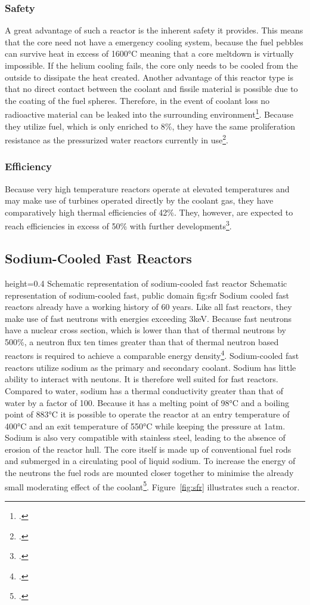 \subsubsection{Safety}
A great advantage of such a reactor is the inherent safety it provides. This means that the core
need not have a emergency cooling system, because the fuel pebbles can survive heat in excess of 1600°C
meaning that a core meltdown is virtually impossible. If the helium cooling fails, the core only needs to
be cooled from the outside to dissipate the heat created. Another advantage of this reactor type is that
no direct contact between the coolant and fissile material is possible due to the coating of the fuel
spheres. Therefore, in the event of coolant loss no radioactive material can be leaked
into the surrounding environment\footcite[18-21]{VHTRTS}.
Because they utilize fuel, which is only enriched to 8\%, they have the same proliferation resistance
as the pressurized water reactors currently in use\footcite{VHTRTS}.
\subsubsection{Efficiency}
Because very high temperature reactors operate at elevated temperatures and may make use of turbines
operated directly by the coolant gas, they have comparatively high thermal efficiencies of 42\%.
They, however, are expected to reach efficiencies in excess of 50\% with further developments\footcite[62]{T4Gen}.
\pagebreak
\subsection{Sodium-Cooled Fast Reactors}\label{chap:sfr}
    {height=0.4\textheight}
    {Schematic representation of sodium-cooled fast reactor}
    {Schematic representation of sodium-cooled fast, public domain}
    {fig:sfr}
Sodium cooled fast reactors already have a working history of 60 years. Like all fast reactors, they make
use of fast neutrons with energies exceeding 3keV. Because fast neutrons have a nuclear cross section, which is lower than that
of thermal neutrons by 500\%, a neutron flux ten times greater than that of thermal neutron based reactors
is required to achieve a comparable energy density\footcite[120-122]{ReactorPhysics}.
Sodium-cooled fast reactors utilize sodium as the primary and secondary coolant. Sodium has little
ability to interact with neutons. It is therefore well suited for fast reactors. Compared
to water, sodium has a thermal conductivity greater than that of water by a factor of 100. Because
it has a melting point of 98°C and a boiling point of 883°C it is possible to operate the reactor at an
entry temperature of 400°C and an exit temperature of 550°C while keeping the pressure at 1atm. Sodium
is also very compatible with stainless steel, leading to the absence of erosion of the reactor hull. The core
itself is made up of conventional fuel rods and submerged in a circulating pool of liquid sodium.
To increase the energy of the neutrons the fuel rods are mounted closer together to minimise the
already small moderating effect of the coolant\footcite[94-110]{T4Gen}. Figure~\ref{fig:sfr} illustrates
such a reactor.

